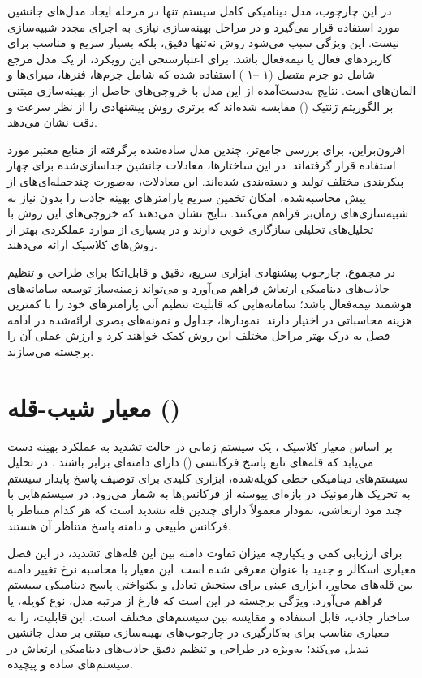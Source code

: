 در این چارچوب، مدل دینامیکی کامل سیستم تنها در مرحله ایجاد مدل‌های جانشین مورد استفاده قرار می‌گیرد و در مراحل بهینه‌سازی نیازی به اجرای مجدد شبیه‌سازی نیست. این ویژگی سبب می‌شود روش 
 نه‌تنها دقیق، بلکه بسیار سریع و مناسب برای کاربردهای فعال یا نیمه‌فعال باشد. برای اعتبارسنجی این رویکرد، از یک مدل مرجع شامل دو جرم متصل 
 (۱ –۱ )
  استفاده شده که شامل جرم‌ها، فنرها، میرای‌ها و المان‌های 
   است. نتایج به‌دست‌آمده از این مدل با خروجی‌های حاصل از بهینه‌سازی مبتنی بر الگوریتم ژنتیک 
   ()
    مقایسه شده‌اند که برتری روش پیشنهادی را از نظر سرعت و دقت نشان می‌دهد.

افزون‌براین، برای بررسی جامع‌تر، چندین مدل ساده‌شده برگرفته از منابع معتبر مورد استفاده قرار گرفته‌اند. در این ساختارها، معادلات جانشین جداسازی‌شده برای چهار پیکربندی مختلف تولید و دسته‌بندی شده‌اند. این معادلات، به‌صورت چندجمله‌ای‌های از پیش محاسبه‌شده، امکان تخمین سریع پارامترهای بهینه جاذب را بدون نیاز به شبیه‌سازی‌های زمان‌بر فراهم می‌کنند. نتایج نشان می‌دهند که خروجی‌های این روش با تحلیل‌های تحلیلی سازگاری خوبی دارند و در بسیاری از موارد عملکردی بهتر از روش‌های کلاسیک ارائه می‌دهند.

در مجموع، چارچوب پیشنهادی 
 ابزاری سریع، دقیق و قابل‌اتکا برای طراحی و تنظیم جاذب‌های دینامیکی ارتعاش فراهم می‌آورد و می‌تواند زمینه‌ساز توسعه سامانه‌های هوشمند نیمه‌فعال باشد؛ سامانه‌هایی که قابلیت تنظیم آنی پارامترهای خود را با کمترین هزینه محاسباتی در اختیار دارند. نمودارها، جداول و نمونه‌های بصری ارائه‌شده در ادامه فصل به درک بهتر مراحل مختلف این روش کمک خواهند کرد و ارزش عملی آن را برجسته می‌سازند.


\section{معیار شیب-قله ()}

بر اساس معیار کلاسیک 
، یک سیستم زمانی در حالت تشدید به عملکرد بهینه دست می‌یابد که قله‌های تابع پاسخ فرکانسی 
()
 دارای دامنه‌ای برابر باشند \cite{chang1980structural, housner1997structural}. در تحلیل سیستم‌های دینامیکی خطی کوپله‌شده، 
  ابزاری کلیدی برای توصیف پاسخ پایدار سیستم به تحریک هارمونیک در بازه‌ای پیوسته از فرکانس‌ها به شمار می‌رود. در سیستم‌هایی با چند مود ارتعاشی، نمودار 
   معمولاً دارای چندین قله تشدید است که هر کدام متناظر با فرکانس طبیعی و دامنه پاسخ متناظر آن هستند.

برای ارزیابی کمی و یکپارچه میزان تفاوت دامنه بین این قله‌های تشدید، در این فصل معیاری اسکالر و جدید با عنوان 
 معرفی شده است. این معیار با محاسبه نرخ تغییر دامنه بین قله‌های مجاور، ابزاری عینی برای سنجش تعادل و یکنواختی پاسخ دینامیکی سیستم فراهم می‌آورد. ویژگی برجسته 
  در این است که فارغ از مرتبه مدل، نوع کوپله، یا ساختار جاذب، قابل استفاده و مقایسه بین سیستم‌های مختلف است. این قابلیت، 
  را به معیاری مناسب برای به‌کارگیری در چارچوب‌های بهینه‌سازی مبتنی بر مدل جانشین تبدیل می‌کند؛ به‌ویژه در طراحی و تنظیم دقیق جاذب‌های دینامیکی ارتعاش در سیستم‌های ساده و پیچیده.

